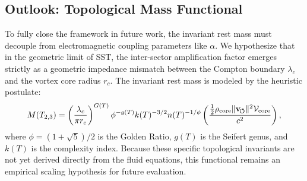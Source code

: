 \documentclass[11pt,a4paper]{article}
\newcommand{\rc}{r_c}
\newcommand{\rhocore}{\rho_{\text{core}}}
\begin{document}
    \subsection{Outlook: Topological Mass Functional}
        To fully close the framework in future work, the invariant rest mass must decouple from electromagnetic coupling parameters like $\alpha$. We hypothesize that in the geometric limit of SST, the inter-sector amplification factor emerges strictly as a geometric impedance mismatch between the Compton boundary $\lambda_c$ and the vortex core radius $\rc$. The invariant rest mass is modeled by the heuristic postulate:
        \begin{equation}
            \label{eq:MassFunctional}
            M(T_{2,3}) = \left( \frac{\lambda_c}{\pi \rc} \right)^{G(T)} \phi^{-g(T)} k(T)^{-3/2} n(T)^{-1/\phi} \left( \frac{\frac{1}{2}\rhocore \lVert\mathbf{v}_{\!\boldsymbol{\circlearrowleft}}\rVert^2 \mathcal{V}_{\rm core}}{c^2} \right),
        \end{equation}
        where $\phi = (1+\sqrt{5})/2$ is the Golden Ratio, $g(T)$ is the Seifert genus, and $k(T)$ is the complexity index. Because these specific topological invariants are not yet derived directly from the fluid equations, this functional remains an empirical scaling hypothesis for future evaluation.
    
\end{document}
